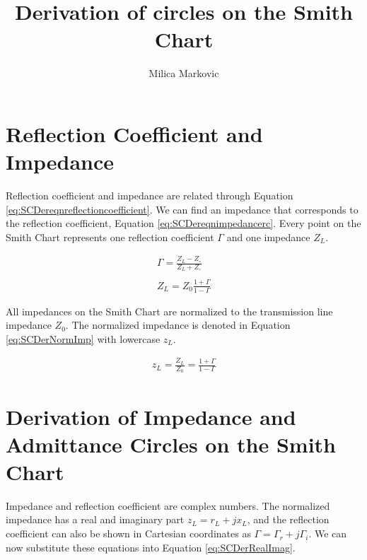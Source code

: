 \documentclass{ximera}
\title{Derivation of circles on the Smith Chart}
\author{Milica Markovic}
\begin{document}
  
\begin{abstract}  

\end{abstract}  
\maketitle    





\section{Reflection Coefficient and Impedance}



Reflection coefficient and impedance are related through Equation \ref{eq:SCDereqnreflectioncoefficient}. We can find an impedance that corresponds to the reflection coefficient, Equation \ref{eq:SCDereqnimpedancerc}. Every point on the Smith Chart represents one reflection coefficient $\Gamma$ and one impedance $Z_L$. 



\begin{eqnarray}
\Gamma = \frac{Z_L-Z_\circ}{Z_L+Z_\circ} \label{eq:SCDereqnreflectioncoefficient} \\ \nonumber \\
Z_L = Z_0 \frac{ 1+ \Gamma}{1- \Gamma } \label{eq:SCDereqnimpedancerc}
\end{eqnarray}


All impedances on the Smith Chart are normalized to the transmission line impedance $Z_0$. The normalized impedance is denoted in Equation \ref{eq:SCDerNormImp} with lowercase $z_L$.

\begin{eqnarray}
z_L = \frac{Z_L}{Z_0} = \frac{ 1+ \Gamma}{1- \Gamma } \label{eq:SCDerNormImp}
\end{eqnarray}

\section{Derivation of Impedance and Admittance Circles on the Smith Chart}

Impedance and reflection coefficient are complex numbers. The normalized impedance has a real and imaginary part $z_L=r_L + j x_L$, and the reflection coefficient can also be shown in Cartesian coordinates as $\Gamma = \Gamma_r + j \Gamma_i $. We can now substitute these equations into Equation \ref{eq:SCDerRealImag}.
\end{document}

